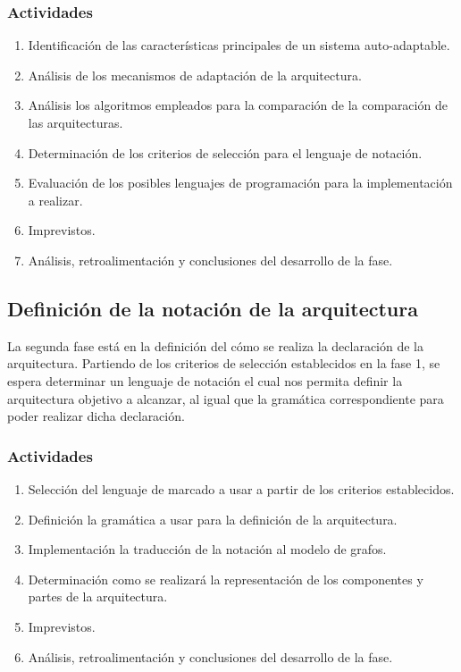 \documentclass[12pt]{article}
\begin{document}
    \subsubsection*{Actividades}

    \begin{enumerate}[label=\thesubsection.\arabic*., wide, labelindent=2em, leftmargin=5em]
        \item Identificación de las características principales de un sistema auto-adaptable.
        \item Análisis de los mecanismos de adaptación de la arquitectura.
        \item Análisis los algoritmos empleados para la comparación de la comparación de las arquitecturas.
        \item Determinación de los criterios de selección para el lenguaje de notación.
        \item Evaluación de los posibles lenguajes de programación para la implementación a realizar.
        \item Imprevistos.
        \item Análisis, retroalimentación y conclusiones del desarrollo de la fase. 
    \end{enumerate} 

    \subsection{Definición de la notación de la arquitectura}
    
    La segunda fase está en la definición del cómo se realiza la declaración de la arquitectura. Partiendo de los criterios de selección establecidos en la fase 1, se espera determinar un lenguaje de notación el cual nos permita definir la arquitectura objetivo a alcanzar, al igual que la gramática correspondiente para poder realizar dicha declaración. 
    
    \subsubsection*{Actividades}

    \begin{enumerate}[label=\thesubsection.\arabic*., wide, labelindent=2em, leftmargin=5em]
        \item Selección del lenguaje de marcado a usar a partir de los criterios establecidos.
        \item Definición la gramática a usar para la definición de la arquitectura.
        \item Implementación la traducción de la notación al modelo de grafos. %
        \item Determinación como se realizará la representación de los componentes y partes de la arquitectura.
        \item Imprevistos.
        \item Análisis, retroalimentación y conclusiones del desarrollo de la fase. 
    \end{enumerate}    
\end{document}
